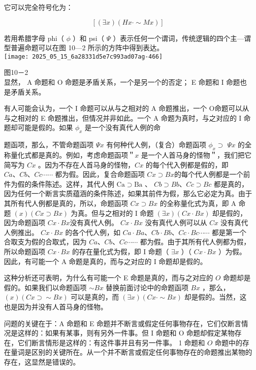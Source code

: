 它可以完全符号化为：

$$
[(\exists x)(H x \cdot \sim M x)]
$$

若用希腊字母 phi（ $\phi$ ）和 psi（ $\Psi$ ）表示任何一个谓词，传统逻辑的四个主—谓型普遍命题可以在图 10—2 所示的方阵中得到表达。\\
\texttt{[image: 2025\_05\_15\_6a28331d5e7c993ad07ag-466]}

图10－2\\
显然， A 命题和 O 命题是矛盾关系，一个是另一个的否定； E 命题和 I 命题也是矛盾关系。

有人可能会认为，一个 I 命题可以从与之相对的 A 命题推出，一个 O命题可以从与之相对的 E 命题推出，但情况并非如此。一个 A 命题为真时，与之对应的 I 命题却可能是假的。如果 $\phi_{x}$ 是一个没有真代人例的命

题函项，那么，不管命题函项 $\Psi x$ 有何种代人例，（复合）命题函项 $\phi_{x} \supset$ $\Psi x$ 的全称量化式都是真的。例如，考虑命题函项＂$x$ 是一个人首马身的怪物＂，我们把它简写为 $C x$ 。因为不存在人首马身的怪物，$C x$ 的每个代入例都是假的，即 $C a 、 C b 、 C c \cdots \cdots$ 都为假。因此，复合命题函项 $C x \supset B x$的每个代人例都是一个前件为假的条件陈述。这样，其代人例 $\mathrm{Ca} \supset \mathrm{Ba}$ 、 $C b \supset B b 、 C c \supset B c$ 都是真的，因为任何一个断言实质蕴涵的条件陈述，如果其前件为假，那么它必定为真。由于其所有代人例都是真的，所以，命题函项 $C x \supset B x$ 的全称量化式为真，即 A 命题 $(x)(C x \supset B x)$ 为真。但与之相对的 I 命题 $(\exists x)(C x \cdot B x)$ 却是假的，因为命题函项 $C x \cdot B x$没有真代人例。 $C x \cdot B x$ 没有真代人例可以从 $C x$ 没有真代人例推出。 $C x \cdot B x$ 的各个代人例，如 $C a \cdot B a 、 C b \cdot B b 、 C c \cdot B c \cdots \cdots$ 都是第一个合取支为假的合取式，因为 $C a 、 C b 、 C c \cdots \cdots$ 都为假。由于其所有代人例都为假，所以命题函项 $C x \cdot B x$ 的存在量化式为假，即 I 命题（ $\exists x$ ）（ $C x \cdot B x$ ）为假。因此，有可能一个 A 命题是真的，而与之对应的 I 命题却是假的。

这种分析还可表明，为什么有可能一个 E 命题是真的，而与之对应的 $O$ 命题却是假的。如果我们以命题函项 $\sim B x$ 替换前面讨论中的命题函项 $B x$ ，那么，$(x)(C x \supset \sim B x)$ 可以是真的，而 $(\exists x)(C x \cdot \sim B x)$ 却是假的。当然，这也是因为并没有人首马身的怪物。

问题的关键在于：A 命题和 E 命题并不断言或假定任何事物存在，它们仅断言情况是这样的：如果有某事，则有另外一件事。但 I 命题和 O 命题却假定某物存在，它们断言情形是这样的：有这件事并且有另一件事。 1 命题和 $O$ 命题中的存在量词是区别的关键所在。从一个并不断言或假定任何事物存在的命题推出某物的存在，这显然是错误的。

